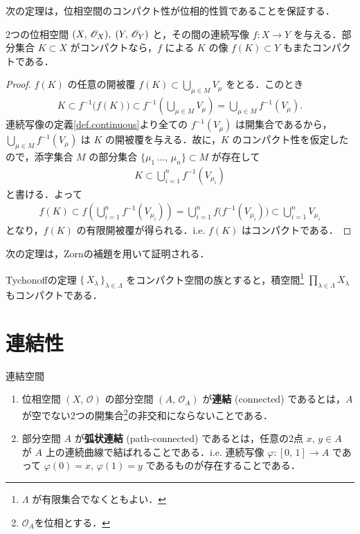 \documentclass[geometry_main]{subfiles}
\begin{document}
次の定理は，位相空間のコンパクト性が位相的性質であることを保証する．

\begin{mytheo}{}
	2つの位相空間 $(X,\, \mathscr{O}_{X}),\; (Y,\, \mathscr{O}_{Y})$ と，その間の連続写像 $f \colon X \to Y$ を与える．部分集合 $K \subset X$ がコンパクトなら，$f$ による $K$ の像 $f(K) \subset Y$ もまたコンパクトである．
\end{mytheo}
\begin{proof}
	$f(K)$ の任意の開被覆 $f(K) \subset \bigcup_{\mu \in M} V_\mu$ をとる．このとき
	\begin{align}
		K \subset f^{-1}\bigl( f(K) \bigr) \subset f^{-1}\left(\bigcup_{\mu \in M} V_\mu\right) = \bigcup_{\mu \in M} f^{-1}(V_\mu).
	\end{align}
	連続写像の定義\ref{def.continuous}より全ての $f^{-1}(V_\mu)$ は開集合であるから，$\bigcup_{\mu \in M} f^{-1}(V_\mu)$ は $K$ の開被覆を与える．故に，$K$ のコンパクト性を仮定したので，添字集合 $M$ の部分集合 $\{ \mu_1\, \dots ,\, \mu_n \} \subset M$ が存在して
	\begin{align}
		K \subset \bigcup_{i=1}^n f^{-1} (V_{\mu_i})
	\end{align}
	と書ける．よって
	\begin{align}
		f(K) \subset f\left( \bigcup_{i=1}^n f^{-1} (V_{\mu_i})\right) = \bigcup_{i=1}^n f\bigl(f^{-1} (V_{\mu_i})\bigr) \subset \bigcup_{i=1}^n V_{\mu_i}
	\end{align}
	となり，$f(K)$ の有限開被覆が得られる．i.e. $f(K)$ はコンパクトである．
\end{proof}

次の定理は，Zornの補題を用いて証明される．
\begin{mytheo}{Tychonoffの定理}
	$\bigl\{\, X_\lambda \,\bigr\}_{\lambda \in \Lambda}$ をコンパクト空間の族とすると，積空間\footnote{$\Lambda$ が有限集合でなくともよい．} $\prod_{\lambda \in \Lambda} X_\lambda$ もコンパクトである．
\end{mytheo}

\section{連結性}

\begin{mydef}[label=def.joint]{連結空間}
	\begin{enumerate}
		\item 位相空間 $(X,\, \mathscr{O})$ の部分空間 $(A,\, \mathscr{O}_A)$ が\textbf{連結} (connected) であるとは，$A$ が空でない2つの開集合\footnote{$\mathscr{O}_A$を位相とする．}の非交和にならないことである．
		\item 部分空間 $A$ が\textbf{弧状連結} (path-connected) であるとは，任意の2点 $x,\, y \in A$ が $A$ 上の連続曲線で結ばれることである．i.e. 連続写像 $\varphi \colon [0,\, 1] \to A$ であって $\varphi(0) = x,\, \varphi(1) = y$ であるものが存在することである． 
	\end{enumerate}
\end{mydef}
\end{document}
